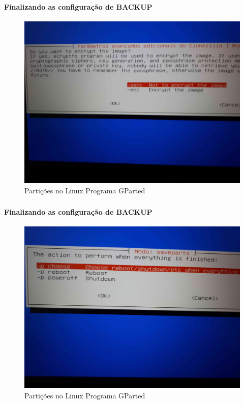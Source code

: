 \documentclass{beamer}
\begin{document}
\begin{frame}[plain,c]
   \frametitle{\insertsection}
    \framesubtitle{Finalizando as configuração de BACKUP}
    \begin{figure}[!h]
        \includegraphics[width=1\linewidth]{images/backup/bkp22.jpg}
        \caption{Partições no Linux Programa GParted}
    \end{figure}
\end{frame}	
\begin{frame}[plain,c]
   \frametitle{\insertsection}
    \framesubtitle{Finalizando as configuração de BACKUP}
    \begin{figure}[!h]
        \includegraphics[width=1\linewidth]{images/backup/bkp23.jpg}
        \caption{Partições no Linux Programa GParted}
    \end{figure}
\end{frame}	
\end{document}
